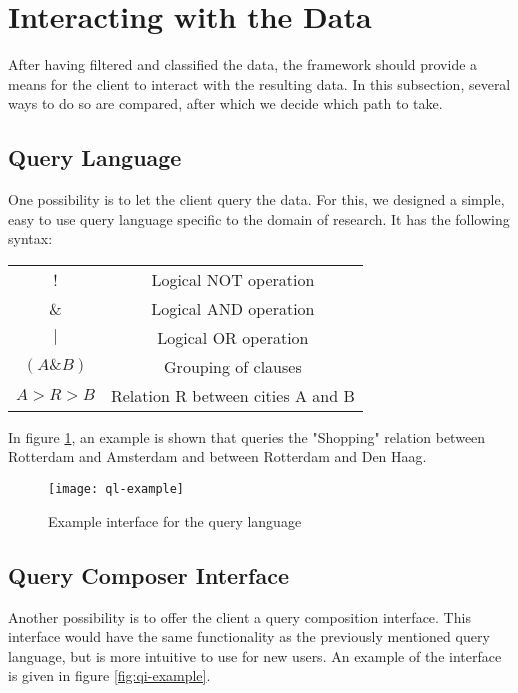 \section{Interacting with the Data}
After having filtered and classified the data, the framework should provide a means for the client to interact with the resulting data. In this subsection, several ways to do so are compared, after which we decide which path to take.

\subsection{Query Language}

One possibility is to let the client query the data. For this, we designed a simple, easy to use query language specific to the domain of research. It has the following syntax:

\begin{center}
\begin{tabular}{ |c|c| } 
 \hline
 ! & Logical NOT operation \\
 \& & Logical AND operation \\ 
 $|$ & Logical OR operation \\ 
 $(A \& B)$ & Grouping of clauses \\
 $A > R > B$ & Relation R between cities A and B \\
 \hline
\end{tabular}
\end{center}

In figure \ref{fig:ql-example}, an example is shown that queries the "Shopping" relation between Rotterdam and Amsterdam and between Rotterdam and Den Haag.

\begin{figure}[ht]
\centering
\texttt{[image: ql-example]}
\caption{Example interface for the query language}
\label{fig:ql-example}
\end{figure}

\subsection{Query Composer Interface}

Another possibility is to offer the client a query composition interface. This interface would have the same functionality as the previously mentioned query language, but is more intuitive to use for new users. An example of the interface is given in figure \ref{fig:qi-example}.

